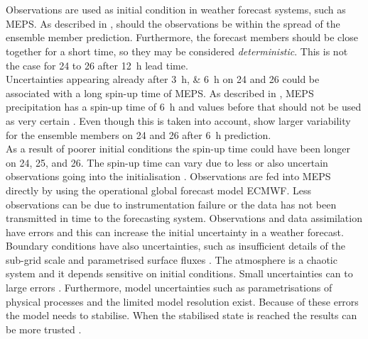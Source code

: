 \\
\\
Observations are used as initial condition in weather forecast systems, such as MEPS.
As described in , should the observations be within the spread of the ensemble member prediction. Furthermore, the forecast members should be close together for a short time, so they may be considered \textit{deterministic}. 
This is not the case for \num{24} to \SI{26}{\dec} after \SI{12}{\hour} lead time.
\\
Uncertainties appearing already after \SIlist{3;6}{\hour} on \num{24} and \SI{26}{\dec} could be associated with a long spin-up time of MEPS. As described in , MEPS precipitation has a spin-up time of \SI{6}{\hour} and values before that should not be used as very certain \citep[][personal communication]{Priv_Comm_Koltzow}. Even though this is taken into account,  show larger variability for the ensemble members on \num{24} and \SI{26}{\dec} after \SI{6}{\hour} prediction.
\\
As a result of poorer initial conditions the spin-up time could have been longer on \num{24}, \num{25}, and \SI{26}{\dec}. The spin-up time can vary due to less or also uncertain observations going into the initialisation \citep{warner_tutorial_1997}. 
Observations are fed into MEPS directly by using the operational global forecast model ECMWF. %
Less observations can be due to instrumentation failure or the data has not been transmitted in time to the forecasting system. Observations and data assimilation have errors and this can increase the initial uncertainty in a weather forecast. 
Boundary conditions have also uncertainties, such as insufficient details of the sub-grid scale and parametrised surface fluxes \citep{owens_ecmwf_2018}. 
The atmosphere is a chaotic system and it depends sensitive on initial conditions. Small uncertainties can to large errors \citep{lorenz_atmospheric_1969}. Furthermore, model uncertainties such as parametrisations of physical processes and the limited model resolution exist. Because of these errors the model needs to stabilise. When the stabilised state is reached the results can be more trusted \citep{Hollingsworth_experiment_79}.
